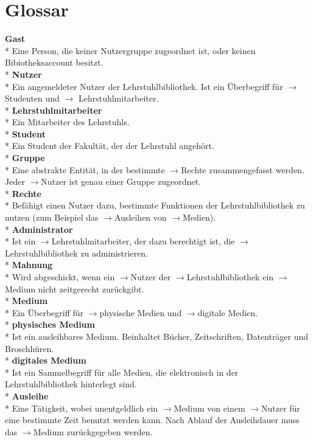 \documentclass[12pt, a4paper]{article}
\begin{document}
\section{Glossar}
\textbf{Gast}
\\*
Eine Person, die keiner Nutzergruppe zugeordnet ist, oder keinen Bibiotheksaccount besitzt.
\\*
\textbf{Nutzer}
\\*
Ein angemeldeter Nutzer der Lehrstuhlbibliothek. Ist ein Überbegriff für $\rightarrow$ Studenten  und $\rightarrow$ Lehrstuhlmitarbeiter.
\\*
\textbf{Lehrstuhlmitarbeiter}
\\*
Ein Mitarbeiter des Lehrstuhls.
\\*
\textbf{Student}
\\*
Ein Student der Fakultät, der der Lehrstuhl angehört.
\\*
\textbf{Gruppe}
\\*
Eine abstrakte Entität, in der bestimmte $\rightarrow$Rechte zusammengefasst werden. Jeder $\rightarrow$Nutzer ist genau einer Gruppe zugeordnet.
\\*
\textbf{Rechte}
\\*
Befähigt einen Nutzer dazu, bestimmte Funktionen der Lehrstuhlbibliothek zu nutzen (zum Beispiel das $\rightarrow$Ausleihen von $\rightarrow$Medien).
\\*
\textbf{Administrator}
\\*
Ist ein $\rightarrow$Lehrstuhlmitarbeiter, der dazu berechtigt ist, die $\rightarrow$Lehrstuhlbibliothek zu administrieren.
\\*
\textbf{Mahnung}
\\*
Wird abgeschickt, wenn ein $\rightarrow$Nutzer der $\rightarrow$Lehrstuhlbibliothek ein $\rightarrow$Medium nicht zeitgerecht zurückgibt.
\\*
\textbf{Medium}
\\*
Ein Überbegriff für $\rightarrow$physische Medien und $\rightarrow$digitale Medien.
\\*
\textbf{physisches Medium}
\\*
Ist ein ausleihbares Medium. Beinhaltet Bücher, Zeitschriften, Datenträger und Broschhüren.
\\*
\textbf{digitales Medium}
\\*
Ist ein Sammelbegriff für alle Medien, die elektronisch in der Lehrstuhlbibliothek hinterlegt sind.
\\*
\textbf{Ausleihe}
\\*
Eine Tätigkeit, wobei unentgeldlich ein $\rightarrow$Medium von einem $\rightarrow$Nutzer für eine bestimmte Zeit benutzt werden kann. Nach Ablauf der Ausleihdauer muss das $\rightarrow$Medium zurückgegeben werden.
\end{document}

